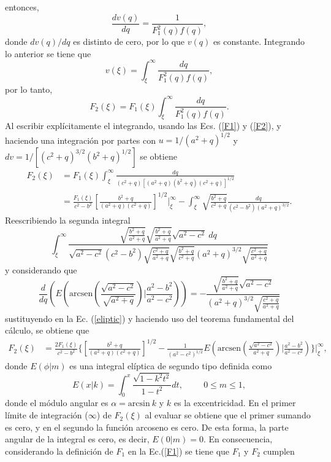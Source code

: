 entonces,
\begin{equation}
    \frac{dv(q)}{dq}=\frac{1}{F_1^2(q)f(q)},
\end{equation}
donde $dv(q)/dq$ es distinto de cero, por lo que $v(q)$ es constante. Integrando lo anterior se tiene que
\begin{equation}
    v(\xi)=\int_{\xi}^{\infty}\frac{dq}{F_1^2(q)f(q)},
\end{equation}
por lo tanto, 
\begin{equation}
  F_2(\xi)=F_1(\xi)\int_{\xi}^{\infty}\frac{dq}{F_1^2(q)f(q)}.
  \label{F2}
\end{equation}
Al escribir explícitamente el integrando, usando las Ecs. (\ref{F1}) y (\ref{F2}), y haciendo una integración por partes con $u=1/(a^2+q)^{1/2}$ y $dv=1/[(c^2+q)^{3/2}(b^2+q)^{1/2}]$ se obtiene
\begin{align}
    F_2(\xi)&=F_1(\xi)\int_{\xi}^{\infty}\frac{dq}{(c^2+q)[(a^2+q)(b^2+q)(c^2+q)]^{1/2}}\nonumber\\
    &=\frac{F_1(\xi)}{c^2-b^2}\left[\frac{b^2+q}{(a^2+q)(c^2+q)}\right]^{1/2}\Bigg|_\xi^{\infty}-\int_\xi^{\infty}\sqrt{\frac{b^2+q}{c^2+q}}\frac{dq}{(c^2-b^2)(a^2+q)^{3/2}}.
\end{align}
Reescribiendo la segunda integral
\begin{equation}
	\int_\xi^{\infty}\frac{\sqrt{\frac{b^2+q}{a^2+q}}\sqrt{\frac{b^2+q}{a^2+q}}\sqrt{a^2-c^2}\:dq}{\sqrt{a^2-c^2}(c^2-b^2)\sqrt{\frac{c^2+q}{a^2+q}}\sqrt{\frac{b^2+q}{c^2+q}}(a^2+q)^{3/2}\sqrt{\frac{c^2+q}{a^2+q}}}\label{eliptic}
\end{equation}
y considerando que
\begin{equation*}
	\frac{d}{dq}\left(E\left(\mbox{arcsen}\left(\frac{\sqrt{a^2-c^2}}{\sqrt{a^2+q}}\right)\Bigg|\frac{a^2-b^2}{a^2-c^2}\right)\right)=-\frac{\sqrt{\frac{b^2+q}{a^2+q}}\sqrt{a^2-c^2}}{(a^2+q)^{3/2}\sqrt{\frac{c^2+q}{a^2+q}}}
\end{equation*}
sustituyendo en la Ec. (\ref{eliptic}) y haciendo uso del teorema fundamental del cálculo, se obtiene que 
\begin{align}
    F_2(\xi)&=\frac{2F_1(\xi)}{c^2-b^2}\Bigg\{\left[\frac{b^2+q}{(a^2+q)(c^2+q)}\right]^{1/2}-\frac{1}{(a^2-c^2)^{1/2}}E\left(\mbox{arcsen}\left(\frac{\sqrt{a^2-c^2}}{a^2+q}\right)\Bigg|\frac{a^2-b^2}{a^2-c^2}\right)\Bigg\}\Bigg|_\xi^{\infty},
\end{align}
donde $E(\phi|m)$ es una integral elíptica de segundo tipo definida como \cite{Abramo}
\begin{equation}
    E(x|k)=\int_{0}^x\frac{\sqrt{1-k^2t^2}}{1-t^2}dt,\hspace{1cm}0\leq m\leq 1,
\end{equation}
donde el módulo angular es $\alpha=\mbox{arcsin}\:k$ y $k$ es la excentricidad. En el primer límite de integración ($\infty$) de $F_2(\xi)$ al evaluar se obtiene que el primer sumando es cero, y en el segundo la función arcoseno es cero. De esta forma, la parte angular de la integral es cero, es decir, $E(0|m)=0$. En consecuencia, considerando la definición de $F_1$ en la Ec.(\ref{F1}) se tiene que $F_1$ y $F_2$ cumplen

